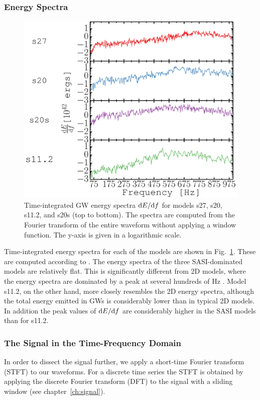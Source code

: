 \subsubsection{Energy Spectra}
\begin{figure}
\centering
\includegraphics[width=0.7\linewidth]{./images/paper1/fig2.pdf}
\caption{Time-integrated GW energy spectra $\mathrm{d} E/ \mathrm{d} f$ for models s27,
s20, s11.2, and s20s (top to bottom). The spectra
are computed from the Fourier transform of the entire waveform
without applying a window function. The y-axis is given in a logarithmic scale.
\label{fig:energy_spectra}}
\end{figure}

Time-integrated energy spectra for each of the models are shown
in Fig.~\ref{fig:energy_spectra}. These are computed according to 
. 
The energy spectra of the three SASI-dominated models are relatively flat. 
This is significantly
different from 2D models, where the energy spectra
are dominated by a peak at several hundreds of $\mathrm{Hz}$
\citep{marek_08,mueller_13,yakunin_15}. Model s11.2, on the other hand, 
more closely resembles the 2D energy spectra, although
the total energy emitted in GWs is considerably lower than in typical 2D models. 
In addition the peak values of $\mathrm{d} E/\mathrm{d} f$
are considerably higher in the SASI models than for s11.2.

\subsubsection{The Signal in the Time-Frequency Domain}
In order to dissect the signal further, we apply a short-time
Fourier transform (STFT) to our waveforms. For a discrete time series
the STFT is obtained by applying the discrete Fourier transform (DFT)
to the signal with a sliding window (see chapter~\ref{ch:signal}).

